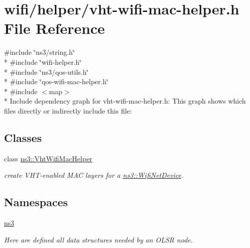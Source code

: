 \hypertarget{vht-wifi-mac-helper_8h}{}\section{wifi/helper/vht-\/wifi-\/mac-\/helper.h File Reference}
\label{vht-wifi-mac-helper_8h}
{\ttfamily \#include \char`\"{}ns3/string.\+h\char`\"{}}\\*
{\ttfamily \#include \char`\"{}wifi-\/helper.\+h\char`\"{}}\\*
{\ttfamily \#include \char`\"{}ns3/qos-\/utils.\+h\char`\"{}}\\*
{\ttfamily \#include \char`\"{}qos-\/wifi-\/mac-\/helper.\+h\char`\"{}}\\*
{\ttfamily \#include $<$map$>$}\\*
Include dependency graph for vht-\/wifi-\/mac-\/helper.h\+:
This graph shows which files directly or indirectly include this file\+:
\subsection*{Classes}
\begin{DoxyCompactItemize}
\item 
class \hyperlink{classns3_1_1VhtWifiMacHelper}{ns3\+::\+Vht\+Wifi\+Mac\+Helper}
\begin{DoxyCompactList}\small\item\em create V\+H\+T-\/enabled M\+AC layers for a \hyperlink{classns3_1_1WifiNetDevice}{ns3\+::\+Wifi\+Net\+Device}. \end{DoxyCompactList}\end{DoxyCompactItemize}
\subsection*{Namespaces}
\begin{DoxyCompactItemize}
\item 
 \hyperlink{namespacens3}{ns3}
\begin{DoxyCompactList}\small\item\em Here are defined all data structures needed by an O\+L\+SR node. \end{DoxyCompactList}\end{DoxyCompactItemize}
